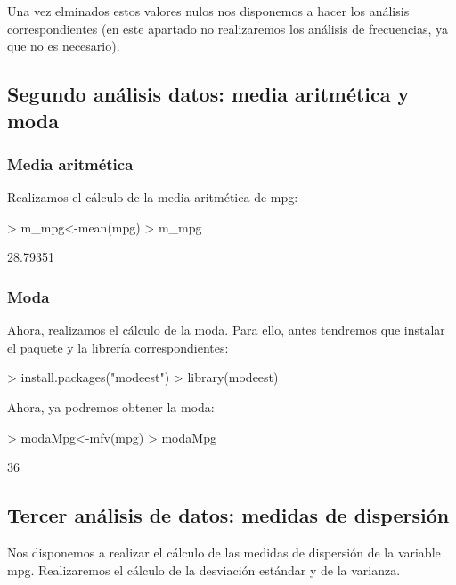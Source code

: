 \documentclass [a4paper] {article}
\begin{document}
Una vez elminados estos valores nulos nos disponemos a hacer los análisis correspondientes (en este apartado no
realizaremos los análisis de frecuencias, ya que no es necesario).

\subsection{Segundo análisis datos: media aritmética y moda }

\subsubsection{Media aritmética}
Realizamos el cálculo de la media aritmética de mpg:

\begin{Schunk}
\begin{Sinput}
> m_mpg<-mean(mpg)
> m_mpg
\end{Sinput}
\begin{Soutput}
[1] 28.79351
\end{Soutput}
\end{Schunk}

\subsubsection{Moda}
Ahora, realizamos el cálculo de la moda. Para ello, antes tendremos que instalar el paquete y la librería
correspondientes:

\begin{Schunk}
\begin{Sinput}
> install.packages("modeest")
> library(modeest)
\end{Sinput}
\end{Schunk}


Ahora, ya podremos obtener la moda:

\begin{Schunk}
\begin{Sinput}
> modaMpg<-mfv(mpg)
> modaMpg
\end{Sinput}
\begin{Soutput}
[1] 36
\end{Soutput}
\end{Schunk}

\subsection{Tercer análisis de datos: medidas de dispersión}
Nos disponemos a realizar el cálculo de las medidas de dispersión de la variable mpg. Realizaremos el cálculo de
la desviación estándar y de la varianza.
\end{document}
